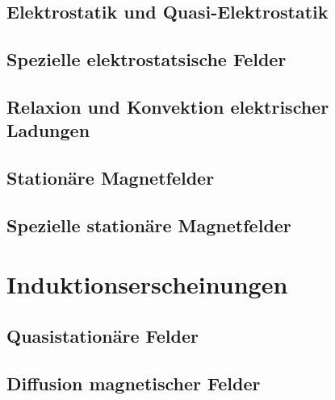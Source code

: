 	\subsection{Elektrostatik und Quasi-Elektrostatik}
	
	
	
	\subsection{Spezielle elektrostatsische Felder}
	
	
	
	\subsection{Relaxion und Konvektion elektrischer Ladungen}
	
	
	
	\subsection{Stationäre Magnetfelder}
	
	
	
	\subsection{Spezielle stationäre Magnetfelder}
	
	
	
	\section{Induktionserscheinungen}
	\subsection{Quasistationäre Felder}
	
	
	
	\subsection{Diffusion magnetischer Felder}
	
